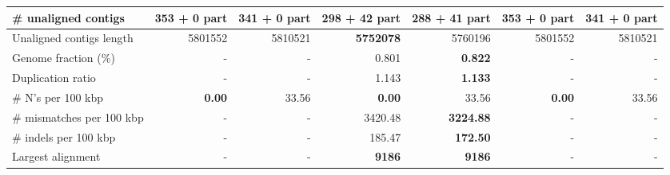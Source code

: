 \documentclass[12pt,a4paper]{article}
\begin{document}
\begin{table}[ht]
\begin{center}
\begin{tabular}{|l*{6}{|r}|}
\# unaligned contigs & 353 + 0 part & 341 + 0 part & 298 + 42 part & {\bf 288 + 41 part} & 353 + 0 part & 341 + 0 part \\ \hline
Unaligned contigs length & 5801552 & 5810521 & {\bf 5752078} & 5760196 & 5801552 & 5810521 \\ \hline
Genome fraction (\%) & - & - & 0.801 & {\bf 0.822} & - & - \\ \hline
Duplication ratio & - & - & 1.143 & {\bf 1.133} & - & - \\ \hline
\# N's per 100 kbp & {\bf 0.00} & 33.56 & {\bf 0.00} & 33.56 & {\bf 0.00} & 33.56 \\ \hline
\# mismatches per 100 kbp & - & - & 3420.48 & {\bf 3224.88} & - & - \\ \hline
\# indels per 100 kbp & - & - & 185.47 & {\bf 172.50} & - & - \\ \hline
Largest alignment & - & - & {\bf 9186} & {\bf 9186} & - & - \\ \hline
\end{tabular}
\end{center}
\end{table}
\end{document}

